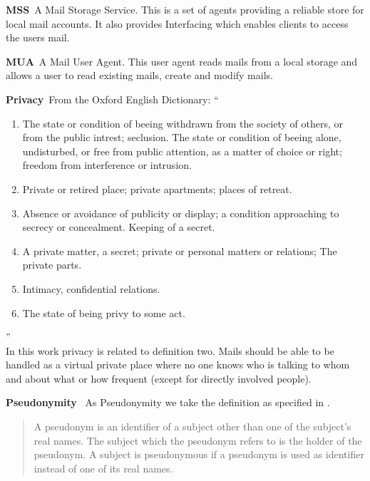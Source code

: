 \documentclass[a4paper,appendixprefix,pdfusetitle,twocolumn,draft,8pt]{scrbook}
\newenvironment{entry}{\par\leavevmode\hangpara{1.5mm}{1}\ignorespaces}{\RaggedRight\par}
\newcommand*{\mainentry}[2]{{\bfseries{#1\label{def:#1}}}~#2\par}
\begin{document}
\begin{entry}
  \mainentry{MSS}{A Mail Storage Service. This is a set of agents providing a reliable store for local mail accounts. It also provides Interfacing which enables clients to access the users mail.}
\end{entry}

\begin{entry}
  \mainentry{MUA}{A Mail User Agent. This user agent reads mails from a local storage and allows a user to read existing mails, create and modify mails.}
\end{entry}

\begin{entry}
  \mainentry{Privacy}{From the Oxford English Dictionary: ``
    \begin{enumerate}
      \item The state or condition of beeing withdrawn from the society of others, or from the public intrest; seclusion. The state or condition of beeing alone, undisturbed, or free from public attention, as a matter of choice or right; freedom from interference or intrusion.
      \item Private or retired place; private apartments; places of retreat.
      \item Absence or avoidance of publicity or display; a condition approaching to secrecy or concealment. Keeping of a secret.
      \item A private matter, a secret; private or personal matters or relations; The private parts.
      \item Intimacy, confidential relations.
      \item The state of being privy to some act.
    \end{enumerate}''\cite{OXFORD}\\
    In this work privacy is related to definition two. Mails should be able to be handled as a virtual private place where no one knows who is talking to whom and about what or how frequent (except for directly involved people).
  }
\end{entry}

\begin{entry}
	\mainentry{Pseudonymity}{
		As Pseudonymity we take the definition as specified in \cite{anon_terminology}.
		\begin{quote}
			A pseudonym is an identifier of a subject other than one of the subject's real names. The subject which the pseudonym refers to is the holder of the pseudonym. A subject is pseudonymous if a pseudonym is used as identifier instead of one of its real names.\omitted
		\end{quote}
	}
\end{entry}
\end{document}
